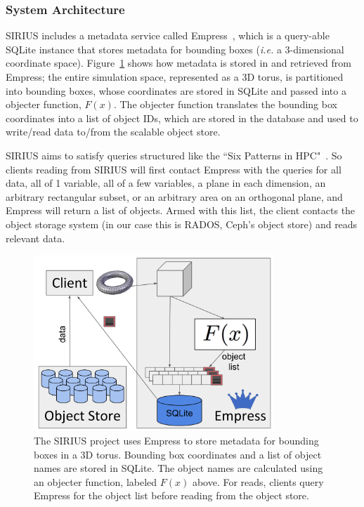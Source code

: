 \subsubsection{System Architecture}

SIRIUS includes a metadata service called Empress~\cite{lawson:pdsw17-empress},
which is a query-able SQLite instance that stores metadata for bounding boxes
({\it i.e.} a 3-dimensional coordinate space).  Figure~\ref{fig:empress} shows
how metadata is stored in and retrieved from Empress; the entire simulation
space, represented as a 3D torus, is partitioned into bounding boxes, whose
coordinates are stored in SQLite and passed into a objecter function, \(F(x)\).
The objecter function translates the bounding box coordinates into a list of
object IDs, which are stored in the database and used to write/read data
to/from the scalable object store.

SIRIUS aims to satisfy queries structured like the ``Six Patterns in
HPC"~\cite{lofstead:hpdc11-6degrees}. So clients reading from SIRIUS will first
contact Empress with the queries for all data, all of 1 variable, all of a few
variables, a plane in each dimension, an arbitrary rectangular subset, or an
arbitrary area on an orthogonal plane, and Empress will return a list of
objects. Armed with this list, the client contacts the object storage system
(in our case this is RADOS, Ceph's object store) and reads relevant data.

\begin{figure}[tb]
\centering
  \includegraphics[width=90mm]{figures/empress.png}
  \caption{The SIRIUS project uses Empress to store metadata for bounding boxes
in a 3D torus. Bounding box coordinates and a list of object names are stored
in SQLite. The object names are calculated using an objecter function, labeled
\(F(x)\) above. For reads, clients query Empress for the object list before
reading from the object store.}
  \label{fig:empress}
\end{figure}

